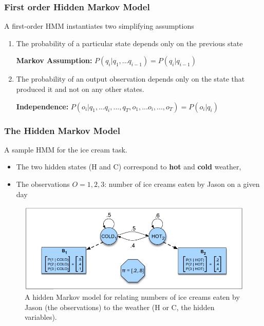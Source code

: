 \documentclass[13.5pt,aspecratio=169]{beamer}
\begin{document}
\begin{frame}
    \onehalfspacing
        \frametitle{First order Hidden Markov Model}
        \begin{block}{A first-order HMM instantiates two simplifying assumptions}
            \begin{enumerate}
                \item The probability of a particular state depends
                only on the previous state
                \begin{center}
                    \textbf{Markov Assumption:} \hspace{0.5em} $P(q_i | q_1,...q_{i-1}) = P(q_i | q_{i-1})$
                \end{center}
                \item The probability of an output observation depends only on the state that
                produced it and not on any other states.
                \begin{center}
                    \textbf{Independence:} $P(o_i | q_1,...q_i,...,q_T, o_1,...o_i,...,o_T) = P(o_i | q_i)$
                \end{center}
            \end{enumerate}
        \end{block}
        
    \end{frame}
\begin{frame}
    \onehalfspacing
        \frametitle{The Hidden Markov Model}
        {
        \begin{block}{ A sample HMM for the ice cream task. }
            \begin{itemize}
                \item The two hidden states
                (H and C) correspond to \textbf{hot} and \textbf{cold} weather,
                \item The observations $O = {1,2,3}$: number of ice creams eaten by Jason on a
                given day
            \end{itemize}
        \end{block}
    }

    \begin{figure}[h]
        \centering
        \includegraphics[scale=0.45]{HMM_ice_example.png}
        \caption{A hidden Markov model for relating numbers of ice creams eaten by Jason (the
        observations) to the weather (H or C, the hidden variables).}
    \end{figure}
    \end{frame}
\end{document}
